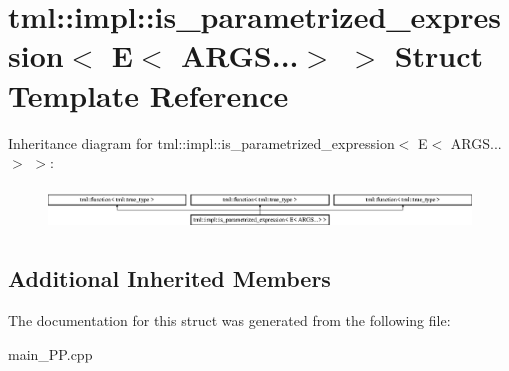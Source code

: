 \hypertarget{structtml_1_1impl_1_1is__parametrized__expression_3_01E_3_01ARGS_8_8_8_4_01_4}{\section{tml\+:\+:impl\+:\+:is\+\_\+parametrized\+\_\+expression$<$ E$<$ A\+R\+G\+S...$>$ $>$ Struct Template Reference}
\label{structtml_1_1impl_1_1is__parametrized__expression_3_01E_3_01ARGS_8_8_8_4_01_4}
}
Inheritance diagram for tml\+:\+:impl\+:\+:is\+\_\+parametrized\+\_\+expression$<$ E$<$ A\+R\+G\+S...$>$ $>$\+:\begin{figure}[H]
\begin{center}
\leavevmode
\includegraphics[height=1.155831cm]{structtml_1_1impl_1_1is__parametrized__expression_3_01E_3_01ARGS_8_8_8_4_01_4}
\end{center}
\end{figure}
\subsection*{Additional Inherited Members}


The documentation for this struct was generated from the following file\+:\begin{DoxyCompactItemize}
\item 
main\+\_\+\+P\+P.\+cpp\end{DoxyCompactItemize}

